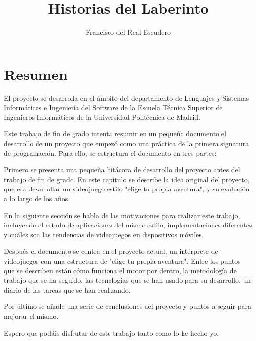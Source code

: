 \documentclass[12pt]{article}
\begin{document}
\title{Historias del Laberinto}
\author{Francisco del Real Escudero}

\maketitle
\thispagestyle{empty}

\newpage

\tableofcontents %
\thispagestyle{empty}

\newpage

\clearpage
\pagestyle{plain}

\section{Resumen}
\onehalfspace

El proyecto se desarrolla en el \'ambito del departamento de Lenguajes y Sistemas Inform\'aticos e Ingenier\'ia del Software de la Escuela T\'ecnica Superior de Ingenieros Inform\'aticos de la Universidad Polit\'ecnica de Madrid.

Este trabajo de fin de grado intenta resumir en un pequeño documento el desarrollo de un proyecto que empez\'o como una pr\'actica de la primera signatura de programaci\'on.
Para ello, se estructura el documento en tres partes:

Primero se presenta una pequeña bit\'acora de desarrollo del proyecto antes del trabajo de fin de grado. En este cap\'itulo se describe la idea original del proyecto, que era desarrollar un videojuego estilo "elige tu propia aventura", y su evoluci\'on a lo largo de los años.

En la siguiente secci\'on se habla de las motivaciones para realizar este trabajo, incluyendo el estado de aplicaciones del mismo estilo, implementaciones diferentes y cu\'ales son las tendencias de videojuegos en dispositivos m\'oviles.

Despu\'es el documento se centra en el proyecto actual, un int\'erprete de videojuegos con una estructura de "elige tu propia aventura". Entre los puntos que se describen est\'an cómo funciona el motor por dentro, la metodolog\'ia de trabajo que se ha seguido, las tecnolog\'ias que se han usado para su desarrollo, un diario de las tareas que se han realizando.

Por \'ultimo se añade una serie de conclusiones del proyecto y puntos a seguir para mejorar el mismo.

Espero que podáis disfrutar de este trabajo tanto como lo he hecho yo.
\end{document}

